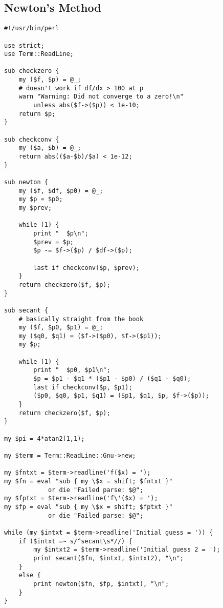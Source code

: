 \documentclass[12pt]{article}
\begin{document}
\subsection*{Newton's Method}
\begin{verbatim}
#!/usr/bin/perl

use strict;
use Term::ReadLine;

sub checkzero {
    my ($f, $p) = @_;
    # doesn't work if df/dx > 100 at p
    warn "Warning: Did not converge to a zero!\n"
        unless abs($f->($p)) < 1e-10;
    return $p;
}

sub checkconv {
    my ($a, $b) = @_;
    return abs(($a-$b)/$a) < 1e-12;
}

sub newton {
    my ($f, $df, $p0) = @_;
    my $p = $p0;
    my $prev;

    while (1) {
        print "  $p\n";
        $prev = $p;
        $p -= $f->($p) / $df->($p);

        last if checkconv($p, $prev);
    }
    return checkzero($f, $p);
}

sub secant {
    # basically straight from the book
    my ($f, $p0, $p1) = @_;
    my ($q0, $q1) = ($f->($p0), $f->($p1));
    my $p;

    while (1) {
        print "  $p0, $p1\n";
        $p = $p1 - $q1 * ($p1 - $p0) / ($q1 - $q0);
        last if checkconv($p, $p1);
        ($p0, $q0, $p1, $q1) = ($p1, $q1, $p, $f->($p));
    }
    return checkzero($f, $p);
}

my $pi = 4*atan2(1,1);

my $term = Term::ReadLine::Gnu->new;

my $fntxt = $term->readline('f($x) = ');
my $fn = eval "sub { my \$x = shift; $fntxt }"
            or die "Failed parse: $@";
my $fptxt = $term->readline('f\'($x) = ');
my $fp = eval "sub { my \$x = shift; $fptxt }"
            or die "Failed parse: $@";

while (my $intxt = $term->readline('Initial guess = ')) {
    if ($intxt =~ s/^secant\s*//) {
        my $intxt2 = $term->readline('Initial guess 2 = ');
        print secant($fn, $intxt, $intxt2), "\n";
    }
    else {
        print newton($fn, $fp, $intxt), "\n";
    }
}
\end{verbatim}
\end{document}
